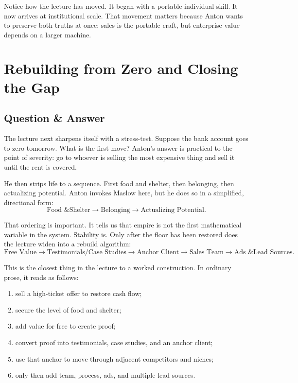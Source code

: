Notice how the lecture has moved. It began with a portable individual skill. It now arrives at institutional scale. That movement matters because Anton wants to preserve both truths at once: sales is the portable craft, but enterprise value depends on a larger machine.

\section{Rebuilding from Zero and Closing the Gap}

\subsection{Question \& Answer}

The lecture next sharpens itself with a stress-test. Suppose the bank account goes to zero tomorrow. What is the first move? Anton's answer is practical to the point of severity: go to whoever is selling the most expensive thing and sell it until the rent is covered.

He then strips life to a sequence. First food and shelter, then belonging, then actualizing potential. Anton invokes Maslow here, but he does so in a simplified, directional form:
\begin{equation}
\text{Food \& Shelter} \to \text{Belonging} \to \text{Actualizing Potential}.
\end{equation}

That ordering is important. It tells us that empire is not the first mathematical variable in the system. Stability is. Only after the floor has been restored does the lecture widen into a rebuild algorithm:
\begin{equation}
\text{Free Value} \to \text{Testimonials/Case Studies} \to \text{Anchor Client} \to \text{Sales Team} \to \text{Ads \& Lead Sources}.
\end{equation}

This is the closest thing in the lecture to a worked construction. In ordinary prose, it reads as follows:
\begin{enumerate}
\item sell a high-ticket offer to restore cash flow;
\item secure the level of food and shelter;
\item add value for free to create proof;
\item convert proof into testimonials, case studies, and an anchor client;
\item use that anchor to move through adjacent competitors and niches;
\item only then add team, process, ads, and multiple lead sources.
\end{enumerate}

